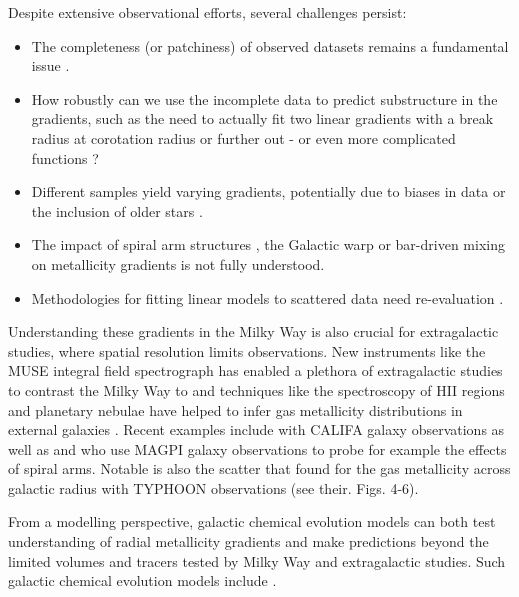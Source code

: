 \documentclass[fleqn,usenatbib]{mnras}
\begin{document}
Despite extensive observational efforts, several challenges persist:
\begin{itemize}
    \item The completeness (or patchiness) of observed datasets remains a fundamental issue \citep{Bergemann2014}.
    \item How robustly can we use the incomplete data to predict substructure in the gradients, such as the need to actually fit two linear gradients with a break radius at corotation radius \citep[][and references therein]{Bresolin2012} or further out \citep{Yong2012, Donor2020} - or even more complicated functions \citep[see e.g.][]{Chiappini2001, Kubryk2015}?
    \item Different samples yield varying gradients, potentially due to biases in data or the inclusion of older stars \citep[e.g.][]{Boeche2013, AllendePrieto2006, Katz2011, Hayden2014, Anders2014, Vickers2021, Willett2023}.
    \item The impact of spiral arm structures \citep{Poggio2021}, the Galactic warp \citep{Lemasle2022} or bar-driven mixing \citep{DiMatteo2013} on metallicity gradients is not fully understood.
    \item Methodologies for fitting linear models to scattered data need re-evaluation \citep{Metha2021}.
\end{itemize}

Understanding these gradients in the Milky Way is also crucial for extragalactic studies, where spatial resolution limits observations. New instruments like the MUSE integral field spectrograph has enabled a plethora of extragalactic studies to contrast the Milky Way to and techniques like the spectroscopy of HII regions and planetary nebulae have helped to infer gas metallicity distributions in external galaxies \citep{Shaver1983, Vilchez1996, Rolleston2000, Bresolin2012}. Recent examples include \citet{Sanchez2014} with CALIFA galaxy observations as well as \citet{Mun2024} and \citet{Chen2024} who use MAGPI galaxy observations to probe for example the effects of spiral arms. Notable is also the scatter that \citet{Chen2023} found for the gas metallicity across galactic radius with TYPHOON observations (see their. Figs. 4-6).

From a modelling perspective, galactic chemical evolution models can both test understanding of radial metallicity gradients and make predictions beyond the limited volumes and tracers tested by Milky Way and extragalactic studies. Such galactic chemical evolution models include \citet{Chiappini2001, Minchev2014b, Kubryk2015, Stanghellini2015, Matteucci2001b}.
\end{document}
